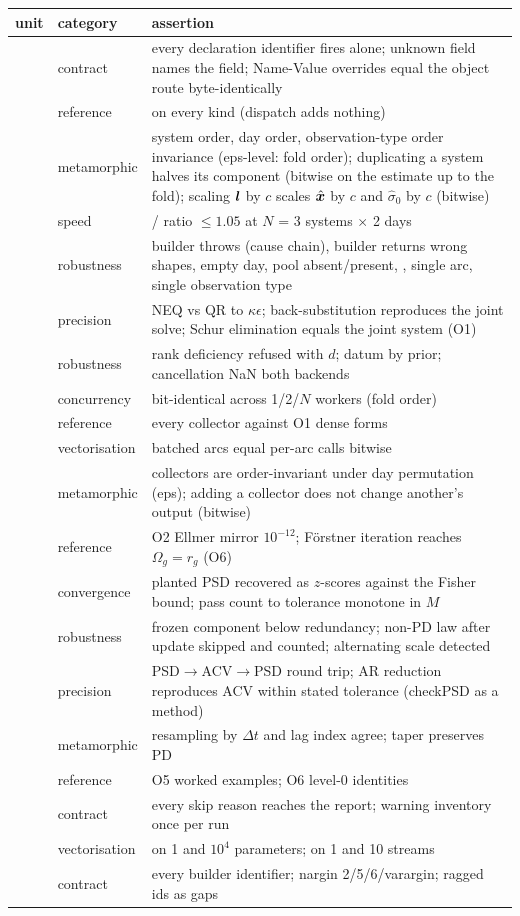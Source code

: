\begin{longtable}{@{}P{24mm}P{18mm}P{110mm}@{}}
\toprule
unit & category & assertion\\
\midrule
{} & contract & every declaration identifier fires alone; unknown field names the field; Name-Value overrides equal the object route byte-identically\\
 & reference &  on every kind (dispatch adds nothing)\\
 & metamorphic & system order, day order, observation-type order invariance (eps-level: fold order); duplicating a system halves its component (bitwise on the estimate up to the fold); scaling $\bm{l}$ by $c$ scales $\hat{\bm{x}}$ by $c$ and $\hat\sigma_0$ by $c$ (bitwise)\\
 & speed & / ratio $\le 1.05$ at $N$ = 3 systems $\times$ 2 days\\
 & robustness & builder throws (cause chain), builder returns wrong shapes, empty day, pool absent/present, , single arc, single observation type\\
 & precision & NEQ vs QR to $\kappa\epsilon$; back-substitution reproduces the joint solve; Schur elimination equals the joint system (O1)\\
 & robustness & rank deficiency refused with $d$; datum by prior; cancellation NaN both backends\\
 & concurrency & bit-identical across 1/2/$N$ workers (fold order)\\
 & reference & every collector against O1 dense forms\\
 & vectorisation & batched arcs equal per-arc calls bitwise\\
 & metamorphic & collectors are order-invariant under day permutation (eps); adding a collector does not change another's output (bitwise)\\
 & reference & O2 Ellmer mirror $10^{-12}$; Förstner iteration reaches $\Omega_g = r_g$ (O6)\\
 & convergence & planted PSD recovered as $z$-scores against the Fisher bound; pass count to tolerance monotone in $M$\\
 & robustness & frozen component below redundancy; non-PD law after update skipped and counted; alternating scale detected\\
 & precision & PSD$\to$ACV$\to$PSD round trip; AR reduction reproduces ACV within stated tolerance (checkPSD as a method)\\
 & metamorphic & resampling by $\Delta t$ and lag index agree; taper preserves PD\\
 & reference & O5 worked examples; O6 level-0 identities\\
 & contract & every skip reason reaches the report; warning inventory once per run\\
 & vectorisation &  on 1 and $10^4$ parameters;  on 1 and 10 streams\\
 & contract & every builder identifier; nargin 2/5/6/varargin; ragged ids as gaps\\
\bottomrule
\end{longtable}

